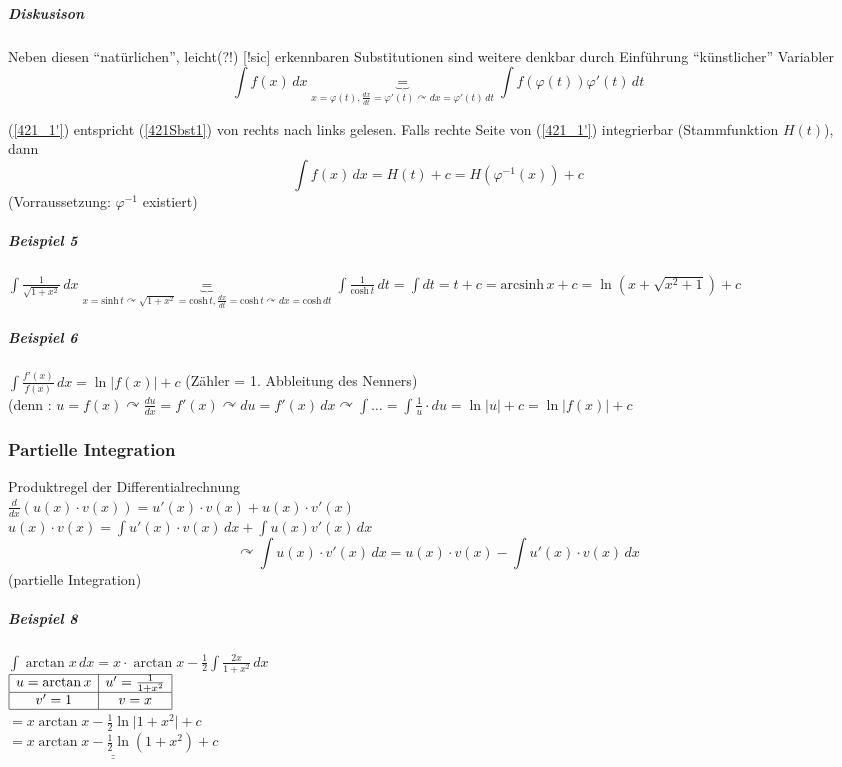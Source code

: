 \documentclass[a4paper]{scrartcl}
\begin{document}
\subparagraph{Diskusison} Neben diesen "`natürlichen"', leicht(?!) [!sic] erkennbaren Substitutionen sind weitere denkbar durch Einführung "`künstlicher"' Variabler
\begin{equation}\label{421_1'}
\int f(x) \, dx \underbrace{=}_{x= \varphi (t), \frac{dx}{dt} = \varphi' (t) \curvearrowright dx = \varphi' (t) \,dt} \int f(\varphi (t)) \varphi' (t) \, dt
\end{equation}

(\ref{421_1'}) entspricht (\ref{421Sbst1}) von rechts nach links gelesen. Falls rechte Seite von (\ref{421_1'}) integrierbar (Stammfunktion $H(t)$), dann 
\[ \int f(x) \, dx = H(t) +c = H(\varphi^{-1} (x)) +c \]
(Vorraussetzung: $\varphi^{-1}$ existiert)

\subparagraph{Beispiel 5} $\int \frac{1}{\sqrt{1+x^2}} \, dx \underbrace{=}_{ x= \text{sinh}\, t \curvearrowright \sqrt{1+x^2} = \text{cosh}\, t, \frac{dx}{dt} = \text{cosh}\, t \curvearrowright dx = \text{cosh} \, dt} \int \frac{1}{\text{cosh}\, t} \, dt = \int dt = t+c = \text{arcsinh}\, x + c = \ln{(x+\sqrt{x^2+1})} +c$

\subparagraph{Beispiel 6} $\int \frac{f'(x)}{f(x)} \, dx = \ln{\lvert f(x) \rvert} +c$ (Zähler = 1. Abbleitung des Nenners)\\
(denn : $u=f(x) \curvearrowright \frac{du}{dx} = f'(x) \curvearrowright du= f'(x) \, dx \curvearrowright \int \dots = \int \frac{1}{u} \cdot du = \ln{\lvert u \rvert} + c = \ln{\lvert f(x)\rvert} +c$

\subsubsection{Partielle Integration}
Produktregel der Differentialrechnung\\
$\frac{d}{dx} (u(x) \cdot v(x)) = u'(x) \cdot v(x) + u(x) \cdot v'(x)$\\
$u(x) \cdot v(x) = \int u'(x) \cdot v(x) \, dx + \int u(x) v'(x) \, dx$
\[\curvearrowright \int u(x) \cdot v'(x) \, dx = u(x) \cdot v(x) - \int u'(x) \cdot v(x) \, dx\]
(partielle Integration)

\subparagraph{Beispiel 8} $\int \arctan{x} \, dx = x \cdot \arctan{x} - \frac{1}{2} \int \frac{2x}{1+x^2} \, dx$\\
$\begin{array}{|c|c|}\hline
u=\arctan{x} & u'= \frac{1}{1+x^2} \\ \hline
v'=1 & v=x \\ \hline
\end{array}$\\
$= x \arctan{x} - \frac{1}{2} \ln{\lvert 1 + x^2 \rvert} + c$\\
$\underline{\underline{= x \arctan{x} - \frac{1}{2} \ln{(1+x^2)}+c}}$
\end{document}
